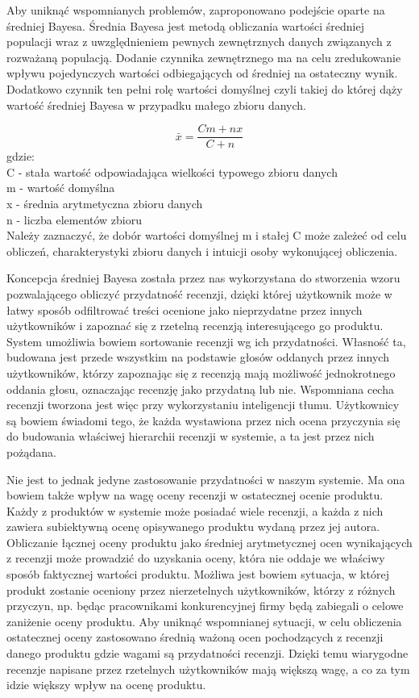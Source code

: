 Aby uniknąć wspomnianych problemów, zaproponowano podejście oparte na średniej Bayesa. Średnia Bayesa jest metodą obliczania wartości średniej populacji wraz z uwzględnieniem pewnych zewnętrznych danych związanych z rozważaną populacją. Dodanie czynnika zewnętrznego ma na celu zredukowanie wpływu pojedynczych wartości odbiegających od średniej na ostateczny wynik. Dodatkowo czynnik ten pełni rolę wartości domyślnej czyli takiej do której dąży wartość średniej Bayesa w przypadku małego zbioru danych.\cite{bayesWiki}

\begin{equation}
\bar{x}=\frac{Cm+nx}{C+n}
\end{equation}
gdzie:\\
C - stała wartość odpowiadająca wielkości typowego zbioru danych\\
m - wartość domyślna\\
x - średnia arytmetyczna zbioru danych\\
n - liczba elementów zbioru\\


Należy zaznaczyć, że dobór wartości domyślnej m i stałej C może zależeć od celu obliczeń, charakterystyki zbioru danych i intuicji osoby wykonującej obliczenia.

Koncepcja średniej Bayesa została przez nas wykorzystana do stworzenia wzoru pozwalającego obliczyć przydatność recenzji, dzięki której użytkownik może w łatwy sposób odfiltrować treści ocenione jako nieprzydatne przez innych użytkowników i zapoznać się z rzetelną recenzją interesującego go produktu. System umożliwia bowiem sortowanie recenzji wg ich przydatności. Własność ta, budowana jest przede wszystkim na podstawie głosów oddanych przez innych użytkowników, którzy zapoznając się z recenzją mają możliwość jednokrotnego oddania głosu, oznaczając recenzję jako przydatną lub nie. Wspomniana cecha recenzji tworzona jest więc przy wykorzystaniu inteligencji tłumu. Użytkownicy są bowiem świadomi tego, że każda wystawiona przez nich ocena przyczynia się do budowania właściwej hierarchii recenzji w systemie, a ta jest przez nich pożądana.

Nie jest to jednak jedyne zastosowanie przydatności w naszym systemie. Ma ona bowiem także wpływ na wagę oceny recenzji w ostatecznej ocenie produktu. Każdy z produktów w systemie może posiadać wiele recenzji, a każda z nich zawiera subiektywną ocenę opisywanego produktu wydaną przez jej autora. Obliczanie łącznej oceny produktu jako średniej arytmetycznej ocen wynikających z recenzji może prowadzić do uzyskania oceny, która nie oddaje we właściwy sposób faktycznej wartości produktu. Możliwa jest bowiem sytuacja, w której produkt zostanie oceniony przez nierzetelnych użytkowników, którzy z różnych przyczyn, np. będąc pracownikami konkurencyjnej firmy będą zabiegali o celowe zaniżenie oceny produktu. Aby uniknąć wspomnianej sytuacji, w celu obliczenia ostatecznej oceny zastosowano średnią ważoną ocen pochodzących z recenzji danego produktu gdzie wagami są przydatności recenzji. Dzięki temu wiarygodne  recenzje napisane przez rzetelnych użytkowników mają większą wagę, a co za tym idzie większy wpływ na ocenę produktu.

